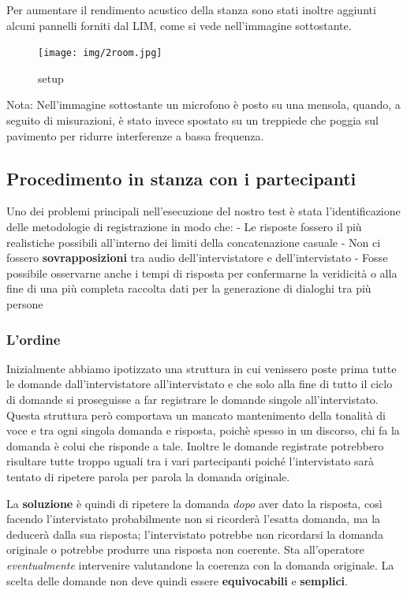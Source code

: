 \documentclass[
]{article}
\begin{document}
Per aumentare il rendimento acustico della stanza sono stati inoltre aggiunti alcuni pannelli forniti dal LIM, come si vede nell'immagine sottostante.

\begin{figure}
\centering
\texttt{[image: img/2room.jpg]}
\caption{setup}
\end{figure}

Nota: Nell'immagine sottostante un microfono è posto su una mensola, quando, a seguito di misurazioni, è stato invece spostato su un treppiede che poggia sul pavimento per ridurre interferenze a bassa frequenza.

\subsection{Procedimento in stanza con i partecipanti}\label{procedimento-in-stanza-con-i-partecipanti}

Uno dei problemi principali nell'esecuzione del nostro test è stata l'identificazione delle metodologie di registrazione in modo che: - Le risposte fossero il più realistiche possibili all'interno dei limiti della concatenazione casuale - Non ci fossero \textbf{sovrapposizioni} tra audio dell'intervistatore e dell'intervistato - Fosse possibile osservarne anche i tempi di risposta per confermarne la veridicità o alla fine di una più completa raccolta dati per la generazione di dialoghi tra più persone

\subsubsection{L'ordine}\label{lordine}

Inizialmente abbiamo ipotizzato una struttura in cui venissero poste prima tutte le domande dall'intervistatore all'intervistato e che solo alla fine di tutto il ciclo di domande si proseguisse a far registrare le domande singole all'intervistato. Questa struttura però comportava un mancato mantenimento della tonalità di voce e tra ogni singola domanda e risposta, poichè spesso in un discorso, chi fa la domanda è colui che risponde a tale. Inoltre le domande registrate potrebbero risultare tutte troppo uguali tra i vari partecipanti poiché l'intervistato sarà tentato di ripetere parola per parola la domanda originale.

La \textbf{soluzione} è quindi di ripetere la domanda \emph{dopo} aver dato la risposta, così facendo l'intervistato probabilmente non si ricorderà l'esatta domanda, ma la deducerà dalla sua risposta; l'intervistato potrebbe non ricordarsi la domanda originale o potrebbe produrre una risposta non coerente. Sta all'operatore \emph{eventualmente} intervenire valutandone la coerenza con la domanda originale. La scelta delle domande non deve quindi essere \textbf{equivocabili} e \textbf{semplici}.
\end{document}
